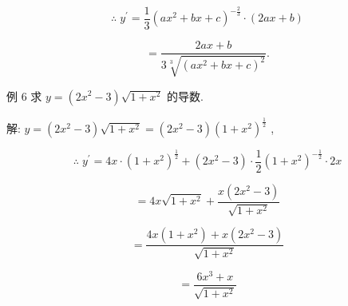 \documentclass[lang=cn,newtx,10pt,scheme=chinese]{elegantbook}
\begin{document}
\[
\therefore \;{y}^{\prime } = \frac{1}{3}{\left( a{x}^{2} + bx + c\right) }^{-\frac{2}{3}} \cdot \left( {{2ax} + b}\right)
\]

\[
= \frac{{2ax} + b}{3\sqrt[3]{{\left( a{x}^{2} + bx + c\right) }^{2}}}.
\]

例 6 求 \(y = \left( {2{x}^{2} - 3}\right) \sqrt{1 + {x}^{2}}\) 的导数.

解: \(y = \left( {2{x}^{2} - 3}\right) \sqrt{1 + {x}^{2}} = \left( {2{x}^{2} - 3}\right) {\left( 1 + {x}^{2}\right) }^{\frac{1}{2}}\) ,

\[
\therefore \;{y}^{\prime } = {4x} \cdot {\left( 1 + {x}^{2}\right) }^{\frac{1}{2}} + \left( {2{x}^{2} - 3}\right) \cdot \frac{1}{2}{\left( 1 + {x}^{2}\right) }^{-\frac{1}{2}} \cdot {2x}
\]

\[
= {4x}\sqrt{1 + {x}^{2}} + \frac{x\left( {2{x}^{2} - 3}\right) }{\sqrt{1 + {x}^{2}}}
\]

\[
= \frac{{4x}\left( {1 + {x}^{2}}\right) + x\left( {2{x}^{2} - 3}\right) }{\sqrt{1 + {x}^{2}}}
\]

\[
= \frac{6{x}^{3} + x}{\sqrt{1 + {x}^{2}}}
\]
\end{document}
